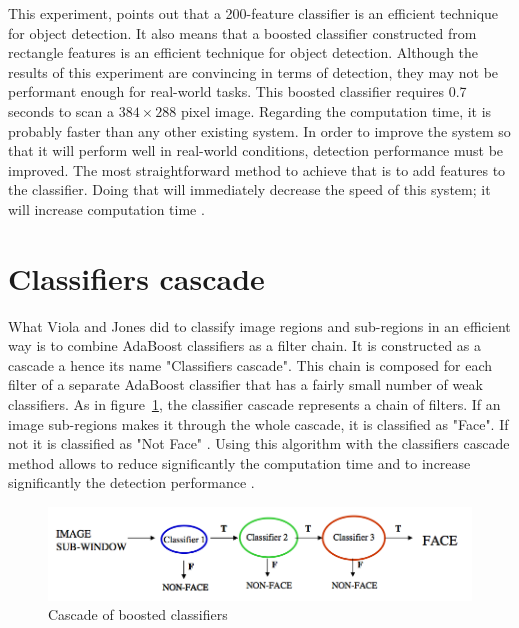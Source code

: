 \noindent This experiment, points out that a 200-feature classifier is an efficient technique for object detection. It also means that a boosted classifier constructed from rectangle features is an efficient technique for object detection. Although the results of this experiment are convincing in terms of detection, they may not be performant enough for real-world tasks. This boosted classifier requires 0.7 seconds to scan a $ 384\times288 $ pixel image. Regarding the computation time, it is probably faster than any other existing system. In order to improve the system so that it will perform well in real-world conditions, detection performance must be improved. The most straightforward method to achieve that is to add features to the classifier. Doing that will immediately decrease the speed of this system; it will increase computation time \cite{VIO01}.
\newline

\section{Classifiers cascade}

\vspace{\baselineskip}
\noindent What Viola and Jones did to classify image regions and sub-regions in an efficient way is to combine AdaBoost classifiers as a filter chain. It is constructed as a cascade a hence its name  "Classifiers cascade". This chain is composed for each filter of a separate AdaBoost classifier that has a fairly small number of weak classifiers. As in figure~\ref{haar_feature_cascade}, the classifier cascade represents a chain of filters. If an image sub-regions makes it through the whole cascade, it is classified as "Face". If not it is classified as "Not Face" \cite{HEW07}. Using this algorithm with the classifiers cascade method allows to reduce significantly the computation time and to increase significantly the detection performance \cite{VIO01}.
\newline

\begin{figure}[!h]
\begin{center}
\noindent \includegraphics[scale=0.5]{figures/haar_feature_cascade} 
\newline
\caption{Cascade of boosted classifiers}
\label{haar_feature_cascade}
\end{center} 
\end{figure}

